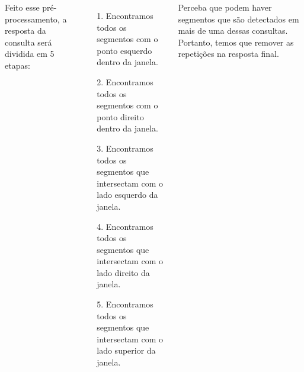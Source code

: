\documentclass[17pt,a1paper,portrait]{tikzposter}
\begin{document}
\begin{columns}
{{    Feito esse pré-processamento, a resposta da consulta será dividida em 5 etapas:\\

    \begin{itemize}
    \item[1.] Encontramos todos os segmentos com o ponto esquerdo dentro da janela. 
    \item[2.] Encontramos todos os segmentos com o ponto direito dentro da janela. 
    \item[3.] Encontramos todos os segmentos que intersectam com o lado esquerdo da janela.
    \item[4.] Encontramos todos os segmentos que intersectam com o lado direito da janela.
    \item[5.] Encontramos todos os segmentos que intersectam com o lado superior da janela.\\
    \end{itemize}
    
    Perceba que podem haver segmentos que são detectados em mais de uma dessas consultas. Portanto, temos que remover as
    repetições na resposta final.

}}


  



{}
\end{columns}
\end{document}
